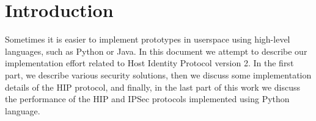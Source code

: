 \section{Introduction}
\label{section:introduction}

Sometimes it is easier to implement prototypes in userspace 
using high-level languages, such as Python or Java. In this 
document we attempt to describe our implementation effort 
related to Host Identity Protocol version 2. In the first 
part, we describe various security solutions, then we 
discuss some implementation details of the HIP protocol, 
and finally, in the last part of this work we discuss the 
performance of the HIP and IPSec protocols implemented using 
Python language.

